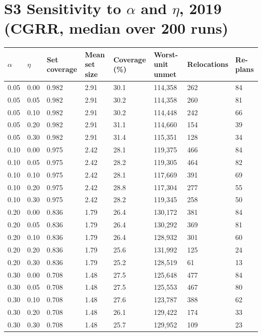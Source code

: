 \documentclass[10pt]{article}
\begin{document}
\section*{S3 Sensitivity to $\alpha$ and $\eta$, 2019 (CGRR, median over 200 runs)}\small\begin{longtable}{llllllll}\toprule $\alpha$ & $\eta$ & Set coverage & Mean set size & Coverage (\%) & Worst-unit unmet & Relocations & Re-plans\\\midrule
0.05 & 0.00 & 0.982 & 2.91 & 30.1 & 114,358 & 262 & 84\\
0.05 & 0.05 & 0.982 & 2.91 & 30.2 & 114,358 & 260 & 81\\
0.05 & 0.10 & 0.982 & 2.91 & 30.2 & 114,448 & 242 & 66\\
0.05 & 0.20 & 0.982 & 2.91 & 31.1 & 114,660 & 154 & 39\\
0.05 & 0.30 & 0.982 & 2.91 & 31.4 & 115,351 & 128 & 34\\
0.10 & 0.00 & 0.975 & 2.42 & 28.1 & 119,375 & 466 & 84\\
0.10 & 0.05 & 0.975 & 2.42 & 28.2 & 119,305 & 464 & 82\\
0.10 & 0.10 & 0.975 & 2.42 & 28.1 & 117,669 & 391 & 69\\
0.10 & 0.20 & 0.975 & 2.42 & 28.8 & 117,304 & 277 & 55\\
0.10 & 0.30 & 0.975 & 2.42 & 28.2 & 119,345 & 258 & 50\\
0.20 & 0.00 & 0.836 & 1.79 & 26.4 & 130,172 & 381 & 84\\
0.20 & 0.05 & 0.836 & 1.79 & 26.4 & 130,292 & 369 & 81\\
0.20 & 0.10 & 0.836 & 1.79 & 26.4 & 128,932 & 301 & 60\\
0.20 & 0.20 & 0.836 & 1.79 & 25.6 & 131,992 & 125 & 24\\
0.20 & 0.30 & 0.836 & 1.79 & 25.2 & 128,519 & 61 & 13\\
0.30 & 0.00 & 0.708 & 1.48 & 27.5 & 125,648 & 477 & 84\\
0.30 & 0.05 & 0.708 & 1.48 & 27.5 & 125,553 & 467 & 80\\
0.30 & 0.10 & 0.708 & 1.48 & 27.6 & 123,787 & 388 & 62\\
0.30 & 0.20 & 0.708 & 1.48 & 26.1 & 129,422 & 174 & 33\\
0.30 & 0.30 & 0.708 & 1.48 & 25.7 & 129,952 & 109 & 23\\
\bottomrule\end{longtable}\normalsize
\end{document}
